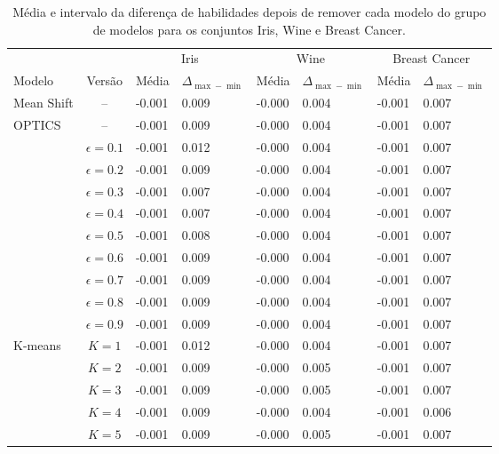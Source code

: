 \begin{table}[!t]
    \centering
    \tiny
    \caption{Média e intervalo da diferença de habilidades depois de remover cada modelo do grupo de modelos para os conjuntos Iris, Wine e Breast Cancer.}
    \label{tab:metrics_iris_wine_breastcancer}
    \begin{tabular}{l|c|ll|ll|ll}
    \midrule
     &  & \multicolumn{2}{c|}{Iris} & \multicolumn{2}{c|}{Wine} & \multicolumn{2}{c}{Breast Cancer} \\
      Modelo   & Versão & Média & $\Delta_{\max-\min}$ & Média & $\Delta_{\max-\min}$ & Média & $\Delta_{\max-\min}$ \\
    \midrule
    Mean Shift & -- & -0.001 & 0.009 & -0.000 & 0.004 & -0.001 & 0.007 \\
    \midrule
    \multirow[t]{6}{*}{OPTICS} & -- & -0.001 & 0.009 & -0.000 & 0.004 & -0.001 & 0.007 \\
    \midrule
    \multirow[t]{9}{*}{DBSCAN} & $\epsilon=0.1$ & -0.001 & 0.012 & -0.000 & 0.004 & -0.001 & 0.007 \\
     & $\epsilon=0.2$ & -0.001 & 0.009 & -0.000 & 0.004 & -0.001 & 0.007 \\
     & $\epsilon=0.3$ & -0.001 & 0.007 & -0.000 & 0.004 & -0.001 & 0.007 \\
     & $\epsilon=0.4$ & -0.001 & 0.007 & -0.000 & 0.004 & -0.001 & 0.007 \\
     & $\epsilon=0.5$ & -0.001 & 0.008 & -0.000 & 0.004 & -0.001 & 0.007 \\
     & $\epsilon=0.6$ & -0.001 & 0.009 & -0.000 & 0.004 & -0.001 & 0.007 \\
     & $\epsilon=0.7$ & -0.001 & 0.009 & -0.000 & 0.004 & -0.001 & 0.007 \\
     & $\epsilon=0.8$ & -0.001 & 0.009 & -0.000 & 0.004 & -0.001 & 0.007 \\
     & $\epsilon=0.9$ & -0.001 & 0.009 & -0.000 & 0.004 & -0.001 & 0.007 \\
    \midrule
    \multirow[t]{8}{*}{K-means} & $K=1$ & -0.001 & 0.012 & -0.000 & 0.004 & -0.001 & 0.007 \\
     & $K=2$ & -0.001 & 0.009 & -0.000 & 0.005 & -0.001 & 0.007 \\
     & $K=3$ & -0.001 & 0.009 & -0.000 & 0.005 & -0.001 & 0.007 \\
     & $K=4$ & -0.001 & 0.009 & -0.000 & 0.004 & -0.001 & 0.006 \\
     & $K=5$ & -0.001 & 0.009 & -0.000 & 0.005 & -0.001 & 0.007 \\

\end{tabular}
\end{table}
